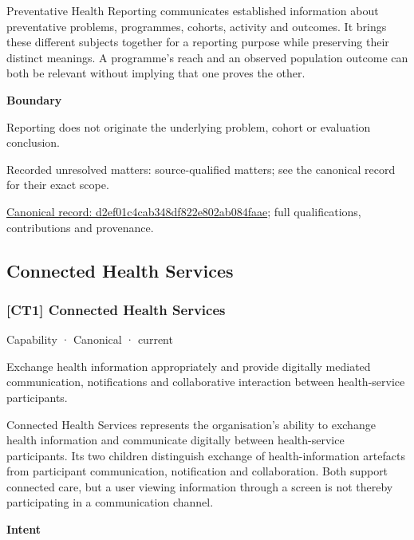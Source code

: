 Preventative Health Reporting communicates established information about preventative problems, programmes, cohorts, activity and outcomes. It brings these different subjects together for a reporting purpose while preserving their distinct meanings. A programme's reach and an observed population outcome can both be relevant without implying that one proves the other.



\textbf{Boundary}



Reporting does not originate the underlying problem, cohort or evaluation conclusion.


{\small Recorded unresolved matters: source-qualified matters; see the canonical record for their exact scope.}\par
{\footnotesize \href{../../../../continuum/strategy/capability/d2ef01c4cab348df822e802ab084faae.md}{Canonical record: d2ef01c4cab348df822e802ab084faae}; full qualifications, contributions and provenance.}\par
\subsection{Connected Health Services}

\subsubsection{[CT1] Connected Health Services}

\label{element:3ef397463e584737b367e93f0bf1d85d}
{\small Capability · Canonical · current}\par

Exchange health information appropriately and provide digitally mediated communication, notifications and collaborative interaction between health-service participants.



Connected Health Services represents the organisation's ability to exchange health information and communicate digitally between health-service participants. Its two children distinguish exchange of health-information artefacts from participant communication, notification and collaboration. Both support connected care, but a user viewing information through a screen is not thereby participating in a communication channel.



\textbf{Intent}



